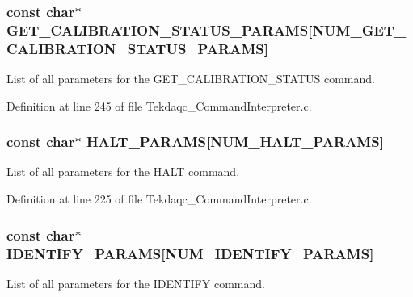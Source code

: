 \hypertarget{group__command__interpreter_gaea50720799ad68731b7672c1974aae1a}{
\subsubsection[{G\-E\-T\-\_\-\-C\-A\-L\-I\-B\-R\-A\-T\-I\-O\-N\-\_\-\-S\-T\-A\-T\-U\-S\-\_\-\-P\-A\-R\-A\-M\-S}]{\setlength{\rightskip}{0pt plus 5cm}const char$\ast$ G\-E\-T\-\_\-\-C\-A\-L\-I\-B\-R\-A\-T\-I\-O\-N\-\_\-\-S\-T\-A\-T\-U\-S\-\_\-\-P\-A\-R\-A\-M\-S\mbox{[}{\bf N\-U\-M\-\_\-\-G\-E\-T\-\_\-\-C\-A\-L\-I\-B\-R\-A\-T\-I\-O\-N\-\_\-\-S\-T\-A\-T\-U\-S\-\_\-\-P\-A\-R\-A\-M\-S}\mbox{]}}}\label{group__command__interpreter_gaea50720799ad68731b7672c1974aae1a}
List of all parameters for the G\-E\-T\-\_\-\-C\-A\-L\-I\-B\-R\-A\-T\-I\-O\-N\-\_\-\-S\-T\-A\-T\-U\-S command. 

Definition at line 245 of file Tekdaqc\-\_\-\-Command\-Interpreter.\-c.

\hypertarget{group__command__interpreter_gafc7b206c3c05fcf1ac21ddd5108f690a}{
\subsubsection[{H\-A\-L\-T\-\_\-\-P\-A\-R\-A\-M\-S}]{\setlength{\rightskip}{0pt plus 5cm}const char$\ast$ H\-A\-L\-T\-\_\-\-P\-A\-R\-A\-M\-S\mbox{[}{\bf N\-U\-M\-\_\-\-H\-A\-L\-T\-\_\-\-P\-A\-R\-A\-M\-S}\mbox{]}}}\label{group__command__interpreter_gafc7b206c3c05fcf1ac21ddd5108f690a}
List of all parameters for the H\-A\-L\-T command. 

Definition at line 225 of file Tekdaqc\-\_\-\-Command\-Interpreter.\-c.

\hypertarget{group__command__interpreter_gab114f1bb247754ff4bbc705b92f53222}{
\subsubsection[{I\-D\-E\-N\-T\-I\-F\-Y\-\_\-\-P\-A\-R\-A\-M\-S}]{\setlength{\rightskip}{0pt plus 5cm}const char$\ast$ I\-D\-E\-N\-T\-I\-F\-Y\-\_\-\-P\-A\-R\-A\-M\-S\mbox{[}{\bf N\-U\-M\-\_\-\-I\-D\-E\-N\-T\-I\-F\-Y\-\_\-\-P\-A\-R\-A\-M\-S}\mbox{]}}}\label{group__command__interpreter_gab114f1bb247754ff4bbc705b92f53222}
List of all parameters for the I\-D\-E\-N\-T\-I\-F\-Y command. 

